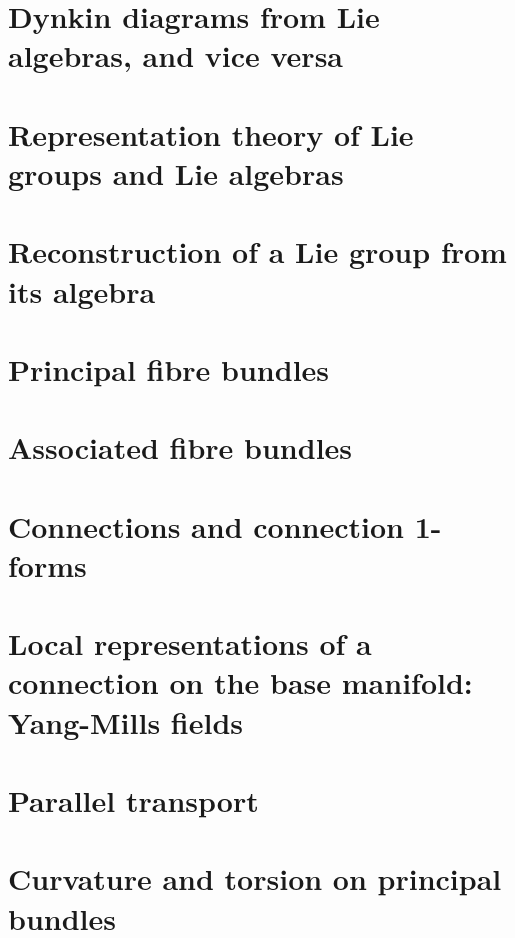 \documentclass[
11pt, %
a4paper, %
oneside, %
headinclude,footinclude, %
]{scrartcl}
\begin{document}
\section{Dynkin diagrams from Lie algebras, and vice versa}



\section{Representation theory of Lie groups and Lie algebras}



\section{Reconstruction of a Lie group from its algebra}



\section{Principal fibre bundles}



\section{Associated fibre bundles}



\section{Connections and connection 1-forms}



\section{Local representations of a connection on the base manifold: Yang-Mills fields}



\section{Parallel transport}



\section{Curvature and torsion on principal bundles}
\end{document}
